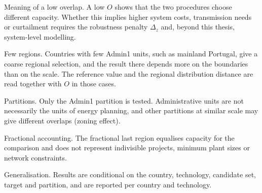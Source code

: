 Meaning of a low overlap. A low $O$ shows that the two procedures choose
different capacity. Whether this implies higher system costs, transmission needs
or curtailment requires the robustness penalty $\Delta_z$ and, beyond this
thesis, system-level modelling.

Few regions. Countries with few Admin1 units, such as mainland Portugal, give a
coarse regional selection, and the result there depends more on the boundaries
than on the scale. The reference value and the regional distribution distance
are read together with $O$ in those cases.

Partitions. Only the Admin1 partition is tested. Administrative units are not
necessarily the units of energy planning, and other partitions at similar scale
may give different overlaps (zoning effect).

Fractional accounting. The fractional last region equalises capacity for the
comparison and does not represent indivisible projects, minimum plant sizes or
network constraints.

Generalisation. Results are conditional on the country, technology, candidate
set, target and partition, and are reported per country and technology.
